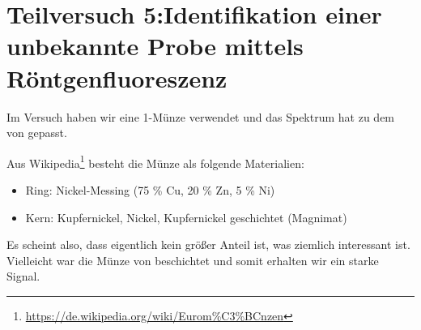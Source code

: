 \section{Teilversuch 5:Identifikation einer unbekannte Probe mittels Röntgen\-flu\-o\-res\-zenz}
	Im Versuch haben wir eine 1\texteuro-Münze verwendet und das Spektrum hat zu dem von  gepasst. 

	Aus Wikipedia\footnote{\url{https://de.wikipedia.org/wiki/Eurom\%C3\%BCnzen}} besteht die Münze als folgende Materialien: 
	\begin{itemize}
		\item Ring: Nickel-Messing (75 \% Cu, 20 \% Zn, 5 \% Ni)
		\item Kern: Kupfernickel, Nickel, Kupfernickel geschichtet (Magnimat) 
	\end{itemize}
	Es scheint also, dass  eigentlich kein größer Anteil ist, was ziemlich interessant ist. Vielleicht war die Münze von  beschichtet und somit erhalten wir ein starke  Signal.
	\vfill